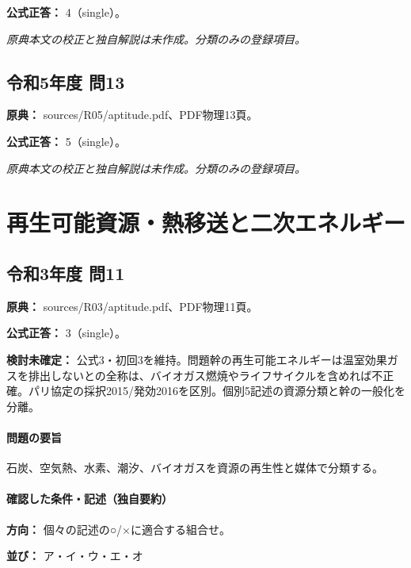 \textbf{公式正答：} 4（single）。

\par\textit{原典本文の校正と独自解説は未作成。分類のみの登録項目。}

\subsection{令和5年度 問13}
\label{q:r05-reg-apt-13}

\noindent\textbf{原典：} sources/R05/aptitude.pdf、PDF物理13頁。

\textbf{公式正答：} 5（single）。

\par\textit{原典本文の校正と独自解説は未作成。分類のみの登録項目。}

\section{再生可能資源・熱移送と二次エネルギー}

\subsection{令和3年度 問11}
\label{q:r03-reg-apt-11}

\noindent\textbf{原典：} sources/R03/aptitude.pdf、PDF物理11頁。

\textbf{公式正答：} 3（single）。

\par\textbf{検討未確定：} 公式3・初回3を維持。問題幹の再生可能エネルギーは温室効果ガスを排出しないとの全称は、バイオガス燃焼やライフサイクルを含めれば不正確。パリ協定の採択2015/発効2016を区別。個別5記述の資源分類と幹の一般化を分離。

\paragraph{問題の要旨} 石炭、空気熱、水素、潮汐、バイオガスを資源の再生性と媒体で分類する。

\paragraph{確認した条件・記述（独自要約）}\mbox{}\par

\noindent\textbf{方向：} 個々の記述の○/×に適合する組合せ。\par

\noindent\textbf{並び：} ア・イ・ウ・エ・オ\par

